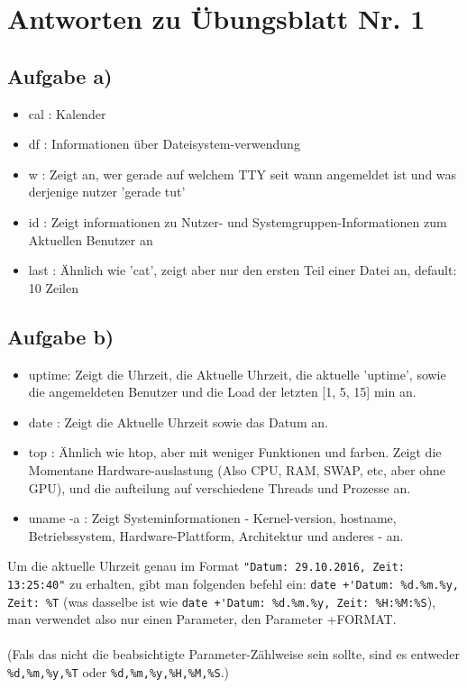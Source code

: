 \documentclass{scrartcl}
\begin{document}
\section*{Antworten zu Übungsblatt Nr. 1}

\subsection*{Aufgabe a)}
\begin{itemize}
\item cal  : Kalender
\item df   : Informationen über Dateisystem-verwendung
\item w    : Zeigt an, wer gerade auf welchem TTY seit wann angemeldet ist und was derjenige nutzer 'gerade tut'
\item id   : Zeigt informationen zu Nutzer- und Systemgruppen-Informationen zum Aktuellen Benutzer an
\item last : Ähnlich wie 'cat', zeigt aber nur den ersten Teil einer Datei an, default: 10 Zeilen
\end{itemize}

\subsection*{Aufgabe b)}
\begin{itemize}
\item uptime: Zeigt die Uhrzeit, die Aktuelle Uhrzeit, die aktuelle 'uptime',
sowie die angemeldeten Benutzer und die Load der letzten [1, 5, 15] min an.
\item date : Zeigt die Aktuelle Uhrzeit sowie das Datum an.
\item top  : Ähnlich wie htop, aber mit weniger Funktionen und farben.
Zeigt die Momentane Hardware-auslastung (Also CPU, RAM, SWAP, etc, aber ohne GPU),
und die aufteilung auf verschiedene Threads und Prozesse an.
\item uname -a : Zeigt Systeminformationen - Kernel-version, hostname, Betriebssystem,
Hardware-Plattform, Architektur und anderes - an.
\end{itemize}
Um die aktuelle Uhrzeit genau im Format \verb+"Datum: 29.10.2016, Zeit: 13:25:40"+
zu erhalten, gibt man folgenden befehl ein: \verb!date +'Datum: %d.%m.%y, Zeit: %T!
(was dasselbe ist wie \verb!date +'Datum: %d.%m.%y, Zeit: %H:%M:%S!), man verwendet also
nur einen Parameter, den Parameter +FORMAT. \\
\\
(Fals das nicht die beabsichtigte Parameter-Zählweise sein sollte, sind es entweder
\verb!%d,%m,%y,%T! oder \verb!%d,%m,%y,%H,%M,%S!.)
\end{document}
